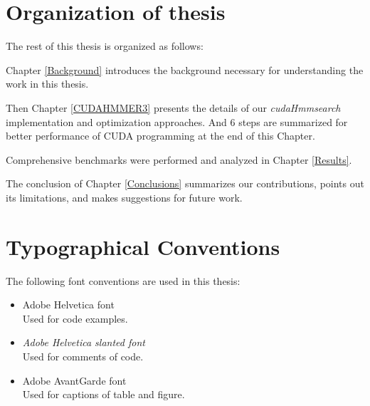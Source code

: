 \section{Organization of thesis}
The rest of this thesis is organized as follows:

Chapter \ref{Background} introduces the background necessary for understanding the work in this thesis.

Then Chapter \ref{CUDAHMMER3} presents the details of our \emph{cudaHmmsearch} implementation and optimization approaches. And 6 steps are summarized for better performance of CUDA programming at the end of this Chapter.

Comprehensive benchmarks were performed and analyzed in Chapter \ref{Results}. 

The conclusion of Chapter \ref{Conclusions} summarizes our contributions, points out its limitations, and makes suggestions for future work.

\section{Typographical Conventions}
The following font conventions are used in this thesis:
\begin{itemize}
 \item {\selectfont Adobe Helvetica font}\\
 Used for code examples.
 \item {\selectfont \textsl{Adobe Helvetica slanted font}}\\
 Used for comments of code.
 \item {\selectfont Adobe AvantGarde font}\\
 Used for captions of table and figure.
\end{itemize}
